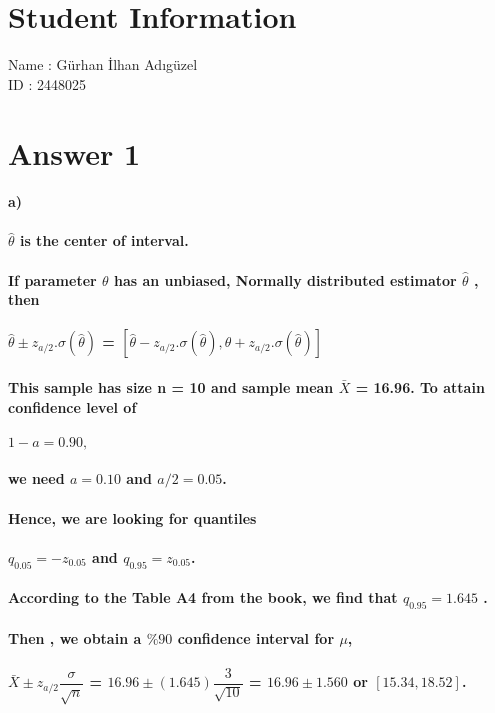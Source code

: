 \documentclass[12pt]{article}
\begin{document}
\section*{Student Information}

Name : Gürhan İlhan Adıgüzel\\

ID : 2448025\\


\section*{Answer 1}
\paragraph{a)
\\\\ $\hat{\theta}$ is the center of interval.
\\\\If parameter $\theta$ has an unbiased, Normally
distributed estimator $\hat{\theta}$ , then
\\\\ {\hspace*{50}} $\hat{\theta} \pm z_{a/2} . \sigma(\hat{\theta})$ = $[\hat{\theta} - z_{a/2} . \sigma(\hat{\theta}) , \hat{\theta} + z_{a/2} . \sigma(\hat{\theta})]$ 
\\\\ This sample has size n = 10 and sample mean $\bar{X}$  = 16.96. To attain confidence level of 
\\\\ {\hspace*{50}} $1-a= 0.90,$ 
\\\\ we need $a = 0.10$ and  $a/2 = 0.05$. \\\\ Hence, we are looking for quantiles 
\\\\ {\hspace*{50}} $q_{0.05} = -z_{0.05}$ and $q_{0.95} = z_{0.05}$.
\\\\ According to the Table A4 from the book, we find that $q_{0.95} = 1.645$ . 
\\\\ Then , we obtain a $\%{90}$ confidence interval for $\mu$, 
\\\\ {\hspace*{50}} $\bar{X} \pm z_{a/2} \dfrac{\sigma}{\sqrt{n}}$ = $16.96 \pm (1.645)\dfrac{3}{\sqrt{10}}$ = $16.96 \pm 1.560 $ or $ [15.34,18.52]$. 
}
\end{document}
